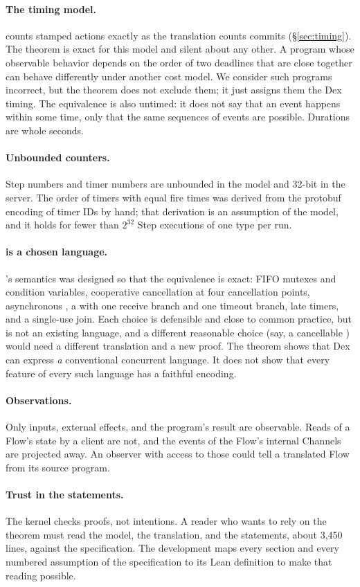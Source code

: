 \paragraph{The timing model.}
\Lang{} counts stamped actions exactly as the translation counts commits
(\S\ref{sec:timing}). The theorem is exact for this model and silent about
any other. A program whose observable behavior depends on the order of two
deadlines that are close together can behave differently under another cost
model. We consider such programs incorrect, but the theorem does not
exclude them; it just assigns them the Dex timing. The equivalence is also
untimed: it does not say that an event happens within some time, only that
the same sequences of events are possible. Durations are whole seconds.

\paragraph{Unbounded counters.}
Step numbers and timer numbers are unbounded in the model and 32-bit in the
server. The order of timers with equal fire times was derived from the
protobuf encoding of timer IDs by hand; that derivation is an assumption of
the model, and it holds for fewer than $2^{32}$ Step executions of one type
per run.

\paragraph{\Lang{} is a chosen language.}
\Lang{}'s semantics was designed so that the equivalence is exact: FIFO
mutexes and condition variables, cooperative cancellation at four
cancellation points, asynchronous , a  with one receive
branch and one timeout branch, late timers, and a single-use join. Each
choice is defensible and close to common practice, but \Lang{} is not an
existing language, and a different reasonable choice (say, a cancellable
) would need a different translation and a new proof. The theorem
shows that Dex can express \emph{a} conventional concurrent language. It
does not show that every feature of every such language has a faithful
encoding.

\paragraph{Observations.}
Only inputs, external effects, and the program's result are observable.
Reads of a Flow's state by a client are not, and the events of the Flow's
internal Channels are projected away. An observer with access to those
could tell a translated Flow from its source program.

\paragraph{Trust in the statements.}
The kernel checks proofs, not intentions. A reader who wants to rely on the
theorem must read the model, the translation, and the statements, about
3,450 lines, against the specification. The development maps every section
and every numbered assumption of the specification to its Lean definition
to make that reading possible.
